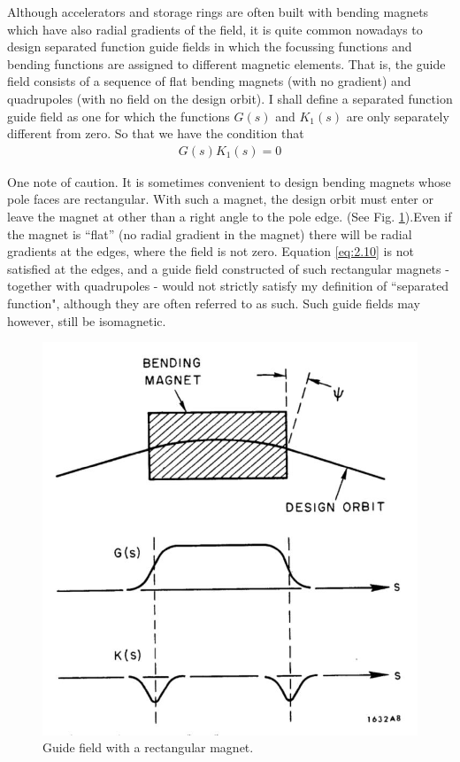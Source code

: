 Although accelerators and storage rings are often built with bending magnets which have also radial gradients of the field, it is quite common nowadays to design separated function guide fields in which the focussing functions and bending functions are assigned to different magnetic elements. That is, the guide field consists of a sequence of flat bending magnets (with no gradient) and quadrupoles (with no field on the design orbit). I shall define a separated function guide field as one for which the functions $G(s)$ and $K_1(s)$ are only separately different from zero. So that we have the condition that
\begin{align}
	G(s)K_1(s) = 0\label{eq:2.10}
\end{align}

One note of caution. It is sometimes convenient to design bending magnets whose pole faces are rectangular. With such a magnet, the design orbit must enter or leave the magnet at other than a right angle to the pole edge. (See Fig. \ref{fig:fig8}).Even if the magnet is “flat” (no radial gradient in the magnet) there will be radial gradients at the edges, where the field is not zero. Equation \eqref{eq:2.10} is not satisfied at the edges, and a guide field constructed of such rectangular magnets - together with quadrupoles - would not strictly satisfy my definition of “separated function", although they are often referred to as such. Such guide fields may however, still be isomagnetic.

\begin{figure}[!htb]
	\centering
	\includegraphics[width=0.6\linewidth]{./Figuras/fig08.jpeg}
	\caption{Guide field with a rectangular magnet.}
	\label{fig:fig8}
\end{figure}
